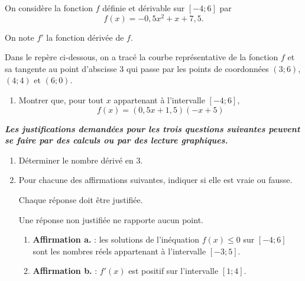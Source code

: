 On considère la fonction $f$ définie et dérivable sur $[-4 ; 6]$ par
\[f(x) = -0,5x^2 +  x + 7,5.\]

On note $f'$ la fonction dérivée de $f$.

Dans le repère ci-dessous, on a tracé la courbe représentative de la fonction $f$ et sa tangente au point d'abscisse 3 qui passe par les points de coordonnées $(3 ; 6)$, $(4 ; 4)$ et $(6 ; 0)$.

\begin{center}
\end{center}
\begin{enumerate}
\item Montrer que, pour tout $x$ appartenant à l'intervalle $[-4 ; 6]$,
\[
f(x)=(0,5x + 1,5)(-x+5)
\]
\end{enumerate}

\textbf{\emph{Les justifications demandées pour les trois questions suivantes peuvent se faire par des calculs ou par des lecture graphiques.}}


\begin{enumerate}[resume]
\item Déterminer le nombre dérivé en 3.
\item Pour chacune des affirmations suivantes, indiquer si elle est vraie ou fausse.

Chaque réponse doit être justifiée.

Une réponse non justifiée ne rapporte aucun point.
\begin{enumerate}
\item \textbf{Affirmation a.} : les solutions de l'inéquation $f(x)\leqslant 0$ sur $[-4 ; 6]$ sont les nombres réels appartenant à l'intervalle $[-3 ; 5]$.

\item \textbf{Affirmation b.} : $f'(x)$ est positif sur l'intervalle $[1 ; 4]$.
\end{enumerate}
\end{enumerate}
